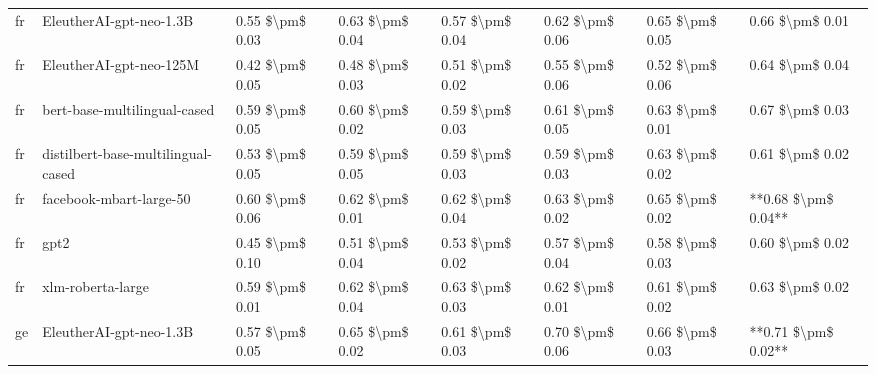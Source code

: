 \begin{tabular}{llllllll}
      fr &            EleutherAI-gpt-neo-1.3B & 0.55 \$\textbackslash pm\$ 0.03 &           0.63 \$\textbackslash pm\$ 0.04 &       0.57 \$\textbackslash pm\$ 0.04 &        0.62 \$\textbackslash pm\$ 0.06 &                         0.65 \$\textbackslash pm\$ 0.05 &     0.66 \$\textbackslash pm\$ 0.01 \\
      fr &            EleutherAI-gpt-neo-125M & 0.42 \$\textbackslash pm\$ 0.05 &           0.48 \$\textbackslash pm\$ 0.03 &       0.51 \$\textbackslash pm\$ 0.02 &        0.55 \$\textbackslash pm\$ 0.06 &                         0.52 \$\textbackslash pm\$ 0.06 &     0.64 \$\textbackslash pm\$ 0.04 \\
      fr &       bert-base-multilingual-cased & 0.59 \$\textbackslash pm\$ 0.05 &           0.60 \$\textbackslash pm\$ 0.02 &       0.59 \$\textbackslash pm\$ 0.03 &        0.61 \$\textbackslash pm\$ 0.05 &                         0.63 \$\textbackslash pm\$ 0.01 &     0.67 \$\textbackslash pm\$ 0.03 \\
      fr & distilbert-base-multilingual-cased & 0.53 \$\textbackslash pm\$ 0.05 &           0.59 \$\textbackslash pm\$ 0.05 &       0.59 \$\textbackslash pm\$ 0.03 &        0.59 \$\textbackslash pm\$ 0.03 &                         0.63 \$\textbackslash pm\$ 0.02 &     0.61 \$\textbackslash pm\$ 0.02 \\
      fr &            facebook-mbart-large-50 & 0.60 \$\textbackslash pm\$ 0.06 &           0.62 \$\textbackslash pm\$ 0.01 &       0.62 \$\textbackslash pm\$ 0.04 &        0.63 \$\textbackslash pm\$ 0.02 &                         0.65 \$\textbackslash pm\$ 0.02 & **0.68 \$\textbackslash pm\$ 0.04** \\
      fr &                               gpt2 & 0.45 \$\textbackslash pm\$ 0.10 &           0.51 \$\textbackslash pm\$ 0.04 &       0.53 \$\textbackslash pm\$ 0.02 &        0.57 \$\textbackslash pm\$ 0.04 &                         0.58 \$\textbackslash pm\$ 0.03 &     0.60 \$\textbackslash pm\$ 0.02 \\
      fr &                  xlm-roberta-large & 0.59 \$\textbackslash pm\$ 0.01 &           0.62 \$\textbackslash pm\$ 0.04 &       0.63 \$\textbackslash pm\$ 0.03 &        0.62 \$\textbackslash pm\$ 0.01 &                         0.61 \$\textbackslash pm\$ 0.02 &     0.63 \$\textbackslash pm\$ 0.02 \\
      ge &            EleutherAI-gpt-neo-1.3B & 0.57 \$\textbackslash pm\$ 0.05 &           0.65 \$\textbackslash pm\$ 0.02 &       0.61 \$\textbackslash pm\$ 0.03 &        0.70 \$\textbackslash pm\$ 0.06 &                         0.66 \$\textbackslash pm\$ 0.03 & **0.71 \$\textbackslash pm\$ 0.02** \\

\end{tabular}
